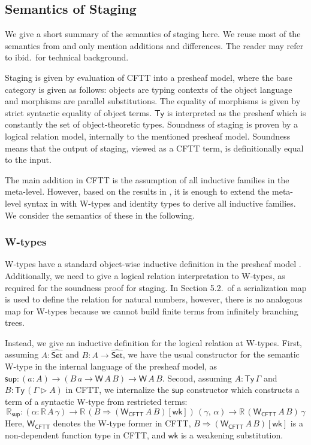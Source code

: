 \documentclass[acmsmall,screen,review,anonymous]{acmart}
\newcommand{\msf}[1]{{\mathsf{#1}}}
\newcommand{\wh}[1]{\widehat{#1}}
\newcommand{\Set}{\msf{Set}}
\newcommand{\ext}{\triangleright}
\newcommand{\Ty}{\msf{Ty}}
\theoremstyle{remark}
\newcommand{\RA}{\Rightarrow}
\begin{document}
\subsection{Semantics of Staging}\label{sec:semantics-of-staging}

We give a short summary of the semantics of staging here. We reuse most of the
semantics from \cite{staged2ltt} and only mention additions and differences. The
reader may refer to ibid.\ for technical background.

Staging is given by evaluation of CFTT into a presheaf model, where the base
category is given as follows: objects are typing contexts of the object language
and morphisms are parallel substitutions. The equality of morphisms is given by
strict syntactic equality of object terms. $\Ty$ is interpreted as the presheaf
which is constantly the set of object-theoretic types. Soundness of staging is
proven by a logical relation model, internally to the mentioned presheaf
model. Soundness means that the output of staging, viewed as a CFTT term, is
definitionally equal to the input.

The main addition in CFTT is the assumption of all inductive families in the
meta-level. However, based on the results in \cite{whynotw}, it is enough to
extend the meta-level syntax in \cite{staged2ltt} with W-types and identity types to
derive all inductive families. We consider the semantics of these in the following.

\subsubsection{W-types} W-types have a standard object-wise inductive definition in
the presheaf model \cite{DBLP:journals/apal/MoerdijkP00}. Additionally, we need to give a logical relation
interpretation to W-types, as required for the soundness proof for staging. In
Section 5.2.\ of \cite{staged2ltt} a serialization map is used to define the relation
for natural numbers, however, there is no analogous map for W-types because we
cannot build finite terms from infinitely branching trees.

Instead, we give an inductive definition for the logical relation at
W-types. First, assuming $A : \wh{\Set}$ and $B : A \to \wh{\Set}$, we have the
usual constructor for the semantic W-type in the internal language of the
presheaf model, as $\msf{sup} : (a : A) \to (B\,a \to \msf{W}\,A\,B) \to
\msf{W}\,A\,B$.  Second, assuming $A : \Ty\,\Gamma$ and $B : \Ty\,(\Gamma \ext
A)$ in CFTT, we internalize the $\msf{sup}$ constructor which constructs a term
of a syntactic W-type from restricted terms:
\[ \mathbb{R}_{\msf{sup}} : (\alpha : \mathbb{R}\,A\,\gamma) \to \mathbb{R}\,(B \RA (\msf{W_{CFTT}}\,A\,B)[\msf{wk}])\,(\gamma,\,\alpha) \to \mathbb{R}\,(\msf{W_{CFTT}}\,A\,B)\,\gamma \]
Here, $\msf{W_{CFTT}}$ denotes the W-type former in CFTT, $B \RA
(\msf{W_{CFTT}}\,A\,B)[\msf{wk}]$ is a non-dependent function type in CFTT, and
$\msf{wk}$ is a weakening substitution.
\end{document}
